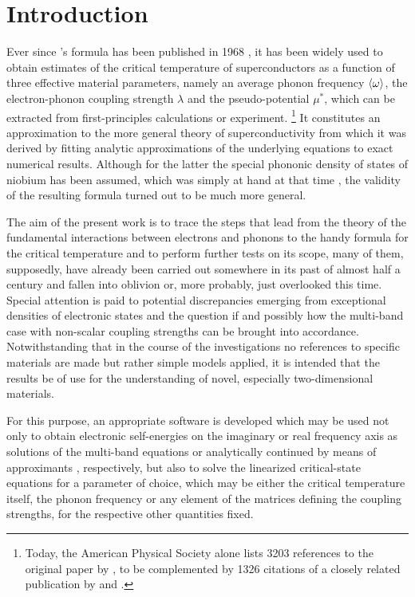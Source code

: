 
\chapter{Introduction}

Ever since 's formula has been published in 1968
\cite{McMillan68}, it has been widely used to obtain estimates of the critical
temperature of superconductors as a function of three effective material
parameters, namely an average phonon frequency $\langle\omega\rangle$, the electron-phonon
coupling strength $\lambda$ and the  pseudo-potential $\mu^*$,
which can be extracted from first-principles calculations or experiment.%
%
\footnote{Today, the American Physical Society alone lists 3203 references to
the original paper by , to be complemented by 1326 citations of a
closely related publication by  and 
\cite{AllenDynes75}.}
%
It constitutes an approximation to the more general  theory of
superconductivity \cite{Eliashberg60} from which it was derived by fitting
analytic approximations of the underlying equations to exact numerical results.
Although for the latter the special phononic density of states of niobium has
been assumed, which was simply at hand at that time \cite{NakagawaWoods63}, the
validity of the resulting formula turned out to be much more general.

The aim of the present work is to trace the steps that lead from the theory of
the fundamental interactions between electrons and phonons to the handy formula
for the critical temperature and to perform further tests on its scope, many of
them, supposedly, have already been carried out somewhere in its past of almost
half a century and fallen into oblivion or, more probably, just overlooked this
time. Special attention is paid to potential discrepancies emerging from
exceptional densities of electronic states and the question if and possibly how
the multi-band case with non-scalar coupling strengths can be brought into
accordance. Notwithstanding that in the course of the investigations no
references to specific materials are made but rather simple models applied, it
is intended that the results be of use for the understanding of novel,
especially two-dimensional materials.

For this purpose, an appropriate software is developed which may be used not
only to obtain electronic self-energies on the imaginary or real frequency axis
as solutions of the multi-band  equations or analytically
continued by means of  approximants \cite{VidbergSerene77},
respectively, but also to solve the linearized critical-state equations for a
parameter of choice, which may be either the critical temperature itself, the
phonon frequency or any element of the matrices defining the coupling strengths,
for the respective other quantities fixed.

